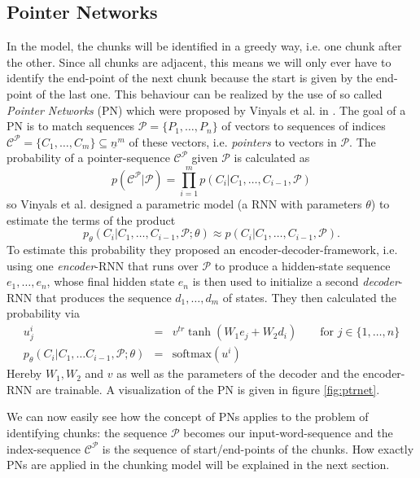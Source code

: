 \documentclass[twoside,11pt,a4paper]{article}
\theoremstyle{break}
\begin{document}
\subsection{Pointer Networks}
\label{sec:ptrnets}
In the model, the chunks will be identified in a greedy way, i.e. one chunk after the other. Since all chunks are adjacent, this means we will only ever have to identify the end-point of the next chunk because the start is given by the end-point of the last one. This behaviour can be realized by the use of so called \textit{Pointer Networks} (PN) which were proposed by Vinyals et al. in \cite{vinyals:2015}. The goal of a PN is to match sequences $\mathcal{P} = \lbrace P_1, \dots, P_n \rbrace$ of vectors to sequences of indices $\mathcal{C}^\mathcal{P} = \lbrace C_1, \dots, C_m \rbrace \subseteq \underline{n}^m$ of these vectors, i.e. \textit{pointers} to vectors in $\mathcal{P}$. The probability of a pointer-sequence $\mathcal{C}^\mathcal{P}$ given $\mathcal{P}$ is calculated as
\[
	p(\mathcal{C}^\mathcal{P} \vert \mathcal{P}) = \prod_{i=1}^m p(C_i \vert C_1, \dots, C_{i-1}, \mathcal{P})
\]
so Vinyals et al. designed a parametric model (a RNN with parameters $\theta$) to estimate the terms of the product
\[
	p_\theta (C_i \vert C_1, \dots, C_{i-1}, \mathcal{P};\theta) \approx p(C_i \vert C_1, \dots, C_{i-1}, \mathcal{P}).
\]
To estimate this probability they proposed an encoder-decoder-framework, i.e. using one \textit{encoder}-RNN that runs over $\mathcal{P}$ to produce a hidden-state sequence $e_1, \dots, e_n$, whose final hidden state $e_n$ is then used to initialize a second \textit{decoder}-RNN that produces the sequence $d_1, \dots, d_m$ of states. They then calculated the probability via
\begin{eqnarray*}
	u_j^i	&=&	v^{tr} \tanh(W_1 e_j + W_2 d_i)	\quad\quad \text{for } j \in \lbrace 1, \dots, n\rbrace\\
	p_\theta(C_i \vert C_1, \dots C_{i-1}, \mathcal{P}; \theta) &=& \text{softmax}(u^i)
\end{eqnarray*}
Hereby $W_1, W_2$ and $v$ as well as the parameters of the decoder and the encoder-RNN are trainable. A visualization of the PN is given in figure \ref{fig:ptrnet}.\par
We can now easily see how the concept of PNs applies to the problem of identifying chunks: the sequence $\mathcal{P}$ becomes our input-word-sequence and the index-sequence $\mathcal{C}^\mathcal{P}$ is the sequence of start/end-points of the chunks. How exactly PNs are applied in the chunking model will be explained in the next section.
\end{document}
